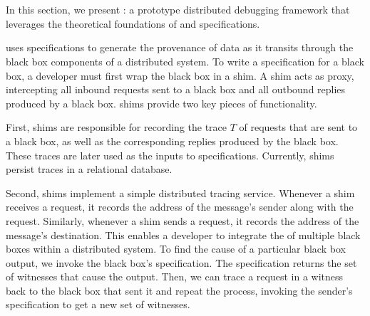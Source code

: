 \section{\fluent{}}
In this section, we present \fluent{}: a prototype distributed debugging
framework that leverages the theoretical foundations of \watprovenance{} and
\watprovenance{} specifications.
%


\fluent{} uses \watprovenance{} specifications to generate the provenance of
data as it transits through the black box components of a distributed system.
To write a \watprovenance{} specification for a black box, a developer must
first wrap the black box in a \fluent{} shim. A shim acts as proxy,
intercepting all inbound requests sent to a black box and all outbound replies
produced by a black box. \fluent{} shims provide two key pieces of
functionality.

First, \fluent{} shims are responsible for recording the trace $T$ of requests
that are sent to a black box, as well as the corresponding replies produced by
the black box. These traces are later used as the inputs to \watprovenance{}
specifications.  Currently, \fluent{} shims persist traces in a relational
database.

Second, \fluent{} shims implement a simple distributed tracing service.
Whenever a \fluent{} shim receives a request, it records the address of the
message's sender along with the request. Similarly, whenever a \fluent{}
shim sends a request, it records the address of the message's
destination.
%
This enables a developer to integrate the \watprovenance{} of multiple black
boxes within a distributed system. To find the cause of a particular black box
output, we invoke the black box's \watprovenance{} specification.  The
specification returns the set of witnesses that cause the output. Then, we can
trace a request in a witness back to the black box that sent it and repeat the
process, invoking the sender's \watprovenance{} specification to get a new set
of witnesses.

